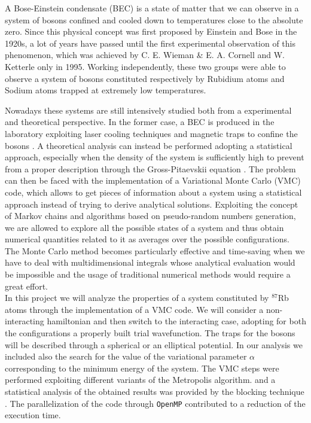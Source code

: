 A Bose-Einstein condensate (BEC) is a state of matter that we can observe in a system of bosons confined and cooled down to temperatures close to the absolute zero. Since this physical concept was first proposed by Einstein and Bose \cite{einstein_original} in the 1920s, a lot of years have passed until the first experimental observation of this phenomenon, which was achieved by C. E. Wieman \& E. A. Cornell \cite{wieman} and W. Ketterle \cite{ketterle} only in 1995. Working independently, these two groups were able to observe a system of bosons constituted respectively by Rubidium atoms and Sodium atoms trapped at extremely low temperatures. 

Nowadays these systems are still intensively studied both from a experimental and theoretical perspective. In the former case, a BEC is produced in the laboratory exploiting laser cooling techniques and magnetic traps to confine the bosons \cite{lasercooling}. A theoretical analysis can instead be performed adopting a statistical approach, especially when the density of the system is sufficiently high to prevent from a proper description through the Gross-Pitaevskii equation \cite{gross}\cite{pita}. The problem can then be faced with the implementation of a Variational Monte Carlo (VMC) code, which allows to get pieces of information about a system using a statistical approach instead of trying to derive analytical solutions. Exploiting the concept of Markov chains \cite{markov} and algorithms based on pseudo-random numbers generation, we are allowed to explore all the possible states of a system and thus obtain numerical quantities related to it as averages over the possible configurations. The Monte Carlo method becomes particularly effective and time-saving when we have to deal with multidimensional integrals whose analytical evaluation would be impossible and the usage of traditional numerical methods would require a great effort. \\


In this project we will analyze the properties of a system constituted by $^{87}$Rb atoms through the implementation of a VMC code. We will consider a non-interacting hamiltonian and then switch to the interacting case, adopting for both the configurations a properly built trial wavefunction. The traps for the bosons will be described through a spherical or an elliptical potential. In our analysis we included also the search for the value of the variational parameter $\alpha$ corresponding to the minimum energy of the system. The VMC steps were performed exploiting different variants of the Metropolis algorithm. \cite{metropolis} \cite{hastings} and a statistical analysis of the obtained results was provided by the blocking technique \cite{Marius}. The parallelization of the code through \texttt{OpenMP} contributed to a reduction of the execution time.


